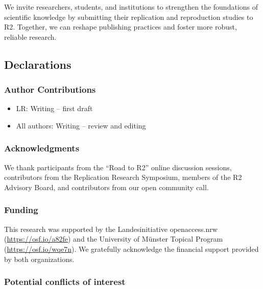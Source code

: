 \documentclass[11pt,a4paper]{article}
\providecommand{\tightlist}{\setlength{\itemsep}{0pt}\setlength{\parskip}{0pt}}
\begin{document}
We invite researchers, students, and institutions to strengthen the
foundations of scientific knowledge by submitting their replication and
reproduction studies to R2. Together, we can reshape publishing
practices and foster more robust, reliable research.

\subsection*{Declarations}\label{declarations}

\subsubsection*{Author Contributions}\label{author-contributions}

\begin{itemize}
\tightlist
\item
  LR: Writing -- first draft
\item
  All authors: Writing -- review and editing
\end{itemize}

\subsubsection*{Acknowledgments}\label{acknowledgments}

We thank participants from the ``Road to R2'' online discussion
sessions, contributors from the Replication Research Symposium, members
of the R2 Advisory Board, and contributors from our open community call.

\subsubsection*{Funding}\label{funding}

This research was supported by the Landesinitiative openaccess.nrw
(\url{https://osf.io/a82fe}) and the University of Münster Topical
Program (\url{https://osf.io/wqe7n}). We gratefully acknowledge the
financial support provided by both organizations.

\subsubsection*{Potential conflicts of
interest}\label{potential-conflicts-of-interest}
\end{document}
